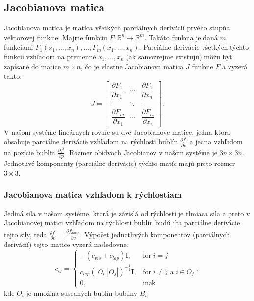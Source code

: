 \subsection*{Jacobianova matica}

Jacobianova matica je matica všetkých parciálnych derivácií prvého stupňa vektorovej funkcie. Majme funkciu $F: \mathbb{R}^{n} \rightarrow \mathbb{R}^{m}$. Takáto funkcia je daná $m$ funkciami $F_1(x_1,\dotsc,x_n),\dotsc,F_m(x_1,\dotsc,x_n)$. Parciálne derivácie všetkých týchto funkcií vzhľadom na premenné $x_{1},...,x_{n}$ (ak samozrejme existujú) môžu byť zapísané do matice $m \times n$, čo je vlastne Jacobianova matica $J$ funkcie $F$ a vyzerá takto:
\begin{equation}
	J=\begin{bmatrix} \dfrac{\partial F_1}{\partial x_1} & \cdots & \dfrac{\partial F_1}{\partial x_n} \\ \vdots & \ddots & \vdots \\ \dfrac{\partial F_m}{\partial x_1} & \cdots & \dfrac{\partial F_m}{\partial x_n}  \end{bmatrix}. 
\end{equation}
V našom systéme lineárnych rovníc su dve Jacobianove matice, jedna ktorá obsahuje parciálne derivácie vzhľadom na rýchlosti bublín $\frac{\partial f^{t}}{\partial v}$ a jedna vzhľadom na pozície bublín $\frac{\partial f^{t}}{\partial p}$. Rozmer obidvoch Jacobianov v našom systéme je $3n \times 3n$. Jednotlivé komponenty (parciálne derivácie) týchto matíc majú preto rozmer $3 \times 3$.

\subsubsection{Jacobianova matica vzhľadom k rýchlostiam}

Jediná sila v našom systéme, ktorá je závislá od rýchlosti je tlmiaca sila a preto v Jacobianovej matici vzhľadom na rýchlosti bublín budú iba parciálne derivácie tejto sily, teda $\frac{\partial f^{t}}{\partial v} = \frac{\partial f_{damp}^{t}}{\partial v}$. Výpočet jednotlivých komponentov (parciálnych derivácií) tejto matice vyzerá nasledovne:
\begin{equation}
	c_{ij} = \left\{\begin{matrix}
	-(c_{vis} + c_{lap})\mathbf{I}, & \textrm{for } i = j\\ 
	c_{lap}\left ( \left | O_{i} \right | \left | O_{j} \right | \right )^{-\frac{1}{2}}\mathbf{I}, & \textrm{for } i \neq  j \textrm{ a } i \in O_{j}\\ 
	0, & \textrm{inak}
	\end{matrix}\right.,	
\end{equation}
kde $O_{i}$ je množina susedných bublín bubliny $B_{i}$.

